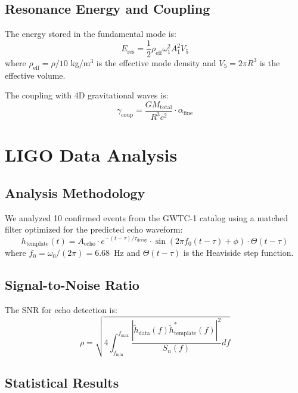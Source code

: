 \documentclass[twocolumn,10pt]{revtex4-2}
\begin{document}
\subsection{Resonance Energy and Coupling}

The energy stored in the fundamental mode is:
\begin{equation}
E_{\text{res}} = \frac{1}{2} \rho_{\text{eff}} \omega_1^2 A_1^2 V_5
\label{eq:resonance_energy}
\end{equation}
where $\rho_{\text{eff}} = \rho/10$ kg/m$^3$ is the effective mode density and $V_5 = 2\pi R^3$ is the effective volume.

The coupling with 4D gravitational waves is:
\begin{equation}
\gamma_{\text{coup}} = \frac{G M_{\text{total}}}{R^3 c^2} \cdot \alpha_{\text{fine}}
\label{eq:coupling}
\end{equation}

\section{LIGO Data Analysis}

\subsection{Analysis Methodology}

We analyzed 10 confirmed events from the GWTC-1 catalog using a matched filter optimized for the predicted echo waveform:
\begin{equation}
h_{\text{template}}(t) = A_{\text{echo}} \cdot e^{-(t-\tau)/\tau_{\text{decay}}} \cdot \sin(2\pi f_0 (t-\tau) + \phi) \cdot \Theta(t-\tau)
\label{eq:template}
\end{equation}
where $f_0 = \omega_0/(2\pi) = 6.68$~Hz and $\Theta(t-\tau)$ is the Heaviside step function.

\subsection{Signal-to-Noise Ratio}

The SNR for echo detection is:
\begin{equation}
\rho = \sqrt{4 \int_{f_{\text{min}}}^{f_{\text{max}}} \frac{|\tilde{h}_{\text{data}}(f) \tilde{h}_{\text{template}}^*(f)|^2}{S_n(f)} df}
\label{eq:snr}
\end{equation}

\subsection{Statistical Results}
\end{document}
